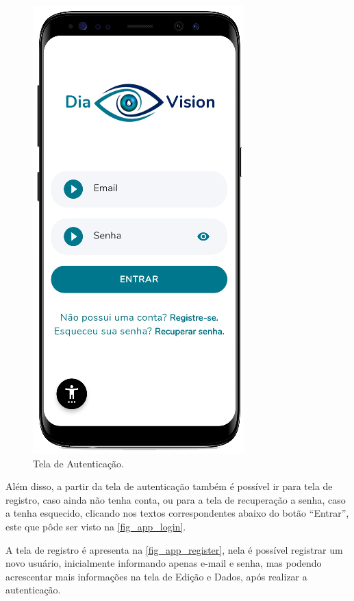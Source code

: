 \begin{figure}[htb]
    \caption{\label{fig_app_login}Tela de Autenticação.}
    \begin{center}
        \includegraphics[scale=0.70]{Imagens/desenvolvimento/app/app_login.png}
    \end{center}
\end{figure}

Além disso, a partir da tela de autenticação também é possível ir para tela de registro,
caso ainda não tenha conta, ou para a tela de recuperação a senha, caso a tenha esquecido,
clicando nos textos correspondentes abaixo do botão ``Entrar'', este que pôde ser visto na
\autoref{fig_app_login}.

\newpage

A tela de registro é apresenta na \autoref{fig_app_register}, nela é possível registrar um novo usuário,
inicialmente informando apenas e-mail e senha, mas podendo acrescentar mais informações  na tela de Edição
e Dados, após realizar a autenticação.

